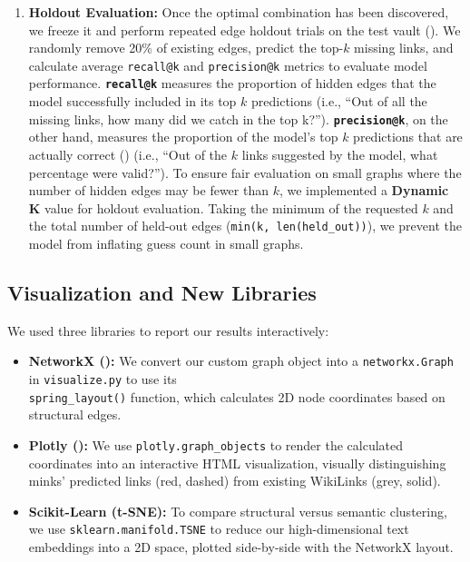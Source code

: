 \documentclass[fontsize=11pt]{article}
\begin{document}
\begin{enumerate}
     \item \textbf{Holdout Evaluation:} Once the optimal combination has been discovered, we freeze it and perform repeated edge holdout trials on the test vault (\cite{gfg_holdout}). We randomly remove 20\% of existing edges, predict the top-$k$ missing links, and calculate average \texttt{recall@k} and \texttt{precision@k} metrics to evaluate model performance. \textbf{\texttt{recall@k}} measures the proportion of hidden edges that the model successfully included in its top $k$ predictions (i.e., \enquote{Out of all the missing links, how many did we catch in the top k?}). \textbf{\texttt{precision@k}}, on the other hand, measures the proportion of the model's top $k$ predictions that are actually correct (\cite{hay_classifier}) (i.e., \enquote{Out of the $k$ links suggested by the model, what percentage were valid?}). To ensure fair evaluation on small graphs where the number of hidden edges may be fewer than $k$, we implemented a \textbf{Dynamic K} value for holdout evaluation. Taking the minimum of the requested $k$ and the total number of held-out edges (\texttt{min(k, len(held\_out))}), we prevent the model from inflating guess count in small graphs.
\end{enumerate}

\subsection*{Visualization and New Libraries}
We used three libraries to report our results interactively:
\begin{itemize}
    \item \textbf{NetworkX (\cite{networkx}):} We convert our custom graph object into a \texttt{networkx.Graph} in \texttt{visualize.py} to use its\\ \texttt{spring\_layout()} function, which calculates 2D node coordinates based on structural edges.
    \item \textbf{Plotly (\cite{plotly}):} We use \texttt{plotly.graph\_objects} to render the calculated coordinates into an interactive HTML visualization, visually distinguishing minks' predicted links (red, dashed) from existing WikiLinks (grey, solid).
    \item \textbf{Scikit-Learn (t-SNE):} To compare structural versus semantic clustering, we use \texttt{sklearn.manifold.TSNE} to reduce our high-dimensional text embeddings into a 2D space, plotted side-by-side with the NetworkX layout.
\end{itemize}
\end{document}
